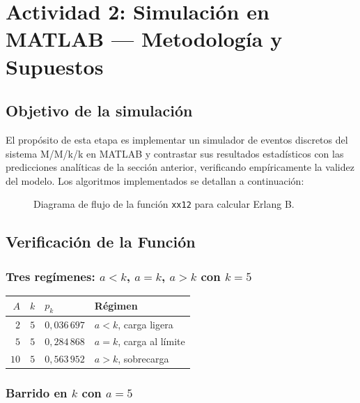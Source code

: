 \documentclass[12pt,a4paper]{article}
\theoremstyle{definition}
\theoremstyle{plain}
\theoremstyle{remark}
\begin{document}
\section{Actividad 2: Simulación en MATLAB --- Metodología y Supuestos}

\subsection*{Objetivo de la simulación}

El propósito de esta etapa es implementar un simulador de eventos discretos del sistema
M/M/k/k en MATLAB y contrastar sus resultados estadísticos con las predicciones analíticas
de la sección anterior, verificando empíricamente la validez del modelo.
Los algoritmos implementados se detallan a continuación:



\begin{figure}[H]
\centering

\caption{Diagrama de flujo de la función \texttt{xx12} para calcular Erlang B.}
\label{fig:diagrama-xx12}
\end{figure}

\subsection*{Verificación de la Función}

\subsubsection*{\texorpdfstring{Tres regímenes: $a<k$, $a=k$, $a>k$ con $k=5$}{Tres regímenes: a<k, a=k, a>k con k=5}}

\begin{center}
\begin{tabular}{rrll}
\toprule
$A$ & $k$ & $p_k$ & Régimen \\
\midrule
$2$  & $5$ & $0{,}036\,697$ & $a<k$, carga ligera \\
$5$  & $5$ & $0{,}284\,868$ & $a=k$, carga al límite \\
$10$ & $5$ & $0{,}563\,952$ & $a>k$, sobrecarga \\
\bottomrule
\end{tabular}
\end{center}

\subsubsection*{\texorpdfstring{Barrido en $k$ con $a=5$}{Barrido en k con a=5}}
\end{document}
